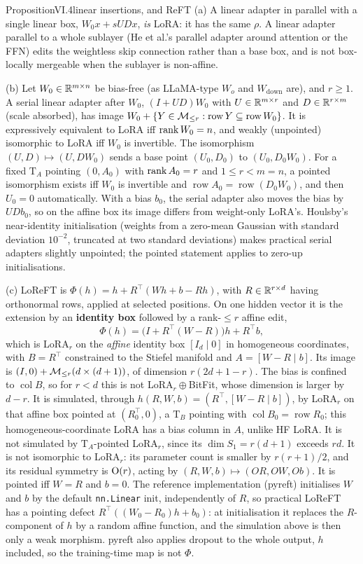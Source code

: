 \begin{restate}{Proposition}{VI.4}{linear insertions, and ReFT}
(a) A linear adapter in parallel with a single linear box, $W_0x+sUDx$, \emph{is} LoRA: it has the same $\rho$. A linear
adapter parallel to a whole sublayer (He et al.'s parallel adapter around attention or the FFN) edits the weightless skip
connection rather than a base box, and is not box-locally mergeable when the sublayer is non-affine.

(b) Let $W_0\in\mathbb{R}^{m\times n}$ be bias-free (as LLaMA-type $W_o$ and $W_{\mathrm{down}}$ are), and $r\ge1$. A serial linear
adapter after $W_0$, $(I+UD)W_0$ with $U\in\mathbb{R}^{m\times r}$ and $D\in\mathbb{R}^{r\times m}$ (scale absorbed), has image
$W_0+\{Y\in\mathcal{M}_{\le r}:\operatorname{row}Y\subseteq\operatorname{row}W_0\}$. It is expressively equivalent to LoRA iff $\operatorname{rank} W_0=n$,
and weakly (unpointed) isomorphic to LoRA iff $W_0$ is invertible. The isomorphism $(U,D)\mapsto(U,DW_0)$ sends a base point
$(U_0,D_0)$ to $(U_0,D_0W_0)$. For a fixed $\mathrm T_A$ pointing $(0,A_0)$ with $\operatorname{rank} A_0=r$ and $1\le r<m=n$, a pointed
isomorphism exists iff $W_0$ is invertible and $\operatorname{row}A_0=\operatorname{row}(D_0W_0)$, and then $U_0=0$
automatically. With a bias $b_0$, the serial adapter also moves the bias by $UDb_0$, so on the affine box its image differs
from weight-only LoRA's. Houlsby's near-identity initialisation (weights from a zero-mean Gaussian with standard
deviation $10^{-2}$, truncated at two standard deviations) makes practical serial adapters slightly unpointed; the pointed
statement applies to zero-up initialisations.

(c) LoReFT is $\Phi(h)=h+R^\top(Wh+b-Rh)$, with $R\in\mathbb{R}^{r\times d}$ having orthonormal rows, applied at selected positions.
On one hidden vector it is the extension by an \textbf{identity box} followed by a rank-$\le r$ affine edit,
\[\Phi(h)=\big(I+R^\top(W-R)\big)h+R^\top b,\]
which is LoRA$_r$ on the \emph{affine} identity box $[I_d\mid0]$ in homogeneous coordinates, with $B=R^\top$ constrained to the
Stiefel manifold and $A=[W-R\mid b]$. Its image is $(I,0)+\mathcal{M}_{\le r}(d\times(d+1))$, of dimension $r(2d+1-r)$. The bias is
confined to $\operatorname{col}B$, so for $r<d$ this is not LoRA$_r{}\oplus{}$BitFit, whose dimension is larger by $d-r$. It is
simulated, through $h(R,W,b)=(R^\top,[W-R\mid b])$, by LoRA$_r$ on that affine box pointed at $(R_0^\top,0)$, a $\mathrm T_B$
pointing with $\operatorname{col}B_0=\operatorname{row}R_0$; this homogeneous-coordinate LoRA has a bias column in $A$, unlike
HF LoRA. It is not simulated by $\mathrm T_A$-pointed LoRA$_r$, since its $\dim S_1=r(d+1)$ exceeds $rd$. It is not isomorphic
to LoRA$_r$: its parameter count is smaller by $r(r+1)/2$, and its residual symmetry is $\mathrm{O}(r)$, acting by
$(R,W,b)\mapsto(OR,OW,Ob)$. It is pointed iff $W=R$ and $b=0$. The reference implementation (pyreft) initialises $W$ and $b$
by the default \texttt{nn.Linear} init, independently of $R$, so practical LoReFT has a pointing defect
$R^\top((W_0-R_0)h+b_0)$: at initialisation it replaces the $R$-component of $h$ by a random affine function, and the
simulation above is then only a weak morphism. pyreft also applies dropout to the whole output, $h$ included, so the
training-time map is not $\Phi$.
\end{restate}

